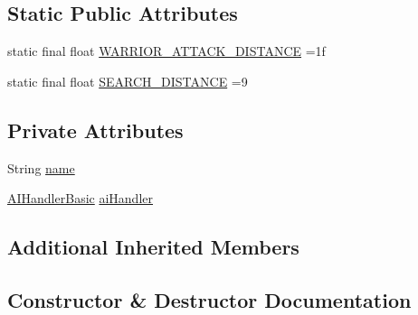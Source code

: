 \subsection*{Static Public Attributes}
\begin{DoxyCompactItemize}
\item 
static final float \mbox{\hyperlink{classentities_1_1_warrior_aaf6556b0d0dd0f3cd24cdf0b8d24d194}{W\+A\+R\+R\+I\+O\+R\+\_\+\+A\+T\+T\+A\+C\+K\+\_\+\+D\+I\+S\+T\+A\+N\+CE}} =1f
\item 
static final float \mbox{\hyperlink{classentities_1_1_warrior_a427155dde1eeb43c8c0219bce3a06a80}{S\+E\+A\+R\+C\+H\+\_\+\+D\+I\+S\+T\+A\+N\+CE}} =9
\end{DoxyCompactItemize}
\subsection*{Private Attributes}
\begin{DoxyCompactItemize}
\item 
String \mbox{\hyperlink{classentities_1_1_warrior_a1fab32d35334023bc7cd4866841e817b}{name}}
\item 
\mbox{\hyperlink{classentities_1_1_a_i_handler_basic}{A\+I\+Handler\+Basic}} \mbox{\hyperlink{classentities_1_1_warrior_a5192a845694a855efc603e4e89d6df38}{ai\+Handler}}
\end{DoxyCompactItemize}
\subsection*{Additional Inherited Members}


\subsection{Constructor \& Destructor Documentation}
\mbox{\label{classentities_1_1_warrior_ac208eac0cd98402f9defd7f808924b05}} 
